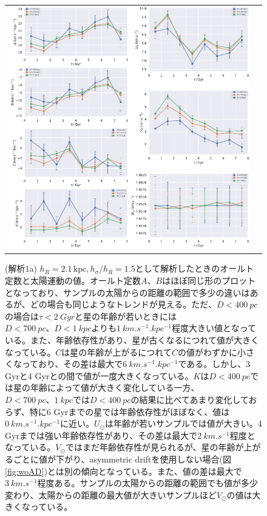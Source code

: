 \begin{figure}
   \centering
\begin{tabular}{cc}
\includegraphics[width=16cm]{fig/1a.pdf}
\end{tabular}
    \caption{(解析1a) $h_R=2.1\,\mathrm{kpc}, h_{\sigma}/h_R=1.5$として解析したときのオールト定数と太陽運動の値。オールト定数$A、B$はほぼ同じ形のプロットとなっており、サンプルの太陽からの距離の範囲で多少の違いはあるが、どの場合も同じようなトレンドが見える。ただ、$D<\SI{400}{pc}$の場合は$\tau<\SI{2}{Gyr}$と星の年齢が若いときには$D<\SI{700}{pc}、D<\SI{1}{kpc}$よりも$\SI{1}{km.s^{-1}.kpc^{-1}}$程度大きい値となっている。また、年齢依存性があり、星が古くなるにつれて値が大きくなっている。$C$は星の年齢が上がるにつれて$C$の値がわずかに小さくなっており、その差は最大で$\SI{6}{km.s^{-1}.kpc^{-1}}$である。しかし、3 Gyrと4 Gyrとの間で値が一度大きくなっている。$K$は$D<\SI{400}{pc}$では星の年齢によって値が大きく変化している一方、$D<\SI{700}{pc}、\SI{1}{kpc}$では$D<\SI{400}{pc}$の結果に比べてあまり変化しておらず、特に6 Gyrまでの星では年齢依存性がほぼなく、値は$\SI{0}{km.s^{-1}.kpc^{-1}}$に近い。$U_{\odot}$は年齢が若いサンプルでは値が大きい。4 Gyrまでは強い年齢依存性があり、その差は最大で$\SI{2}{km.s^{-1}}$程度となっている。$V_{\odot}$ではまだ年齢依存性が見られるが、星の年齢が上がるごとに値が下がり、asymmetric driftを使用しない場合(図\ref{fig:woAD})とは別の傾向となっている。また、値の差は最大で$\SI{3}{km.s^{-1}}$程度ある。サンプルの太陽からの距離の範囲でも値が多少変わり、太陽からの距離の最大値が大きいサンプルほど$V_{\odot}$の値は大きくなっている。}
    \label{figObs1a}
\end{figure}

